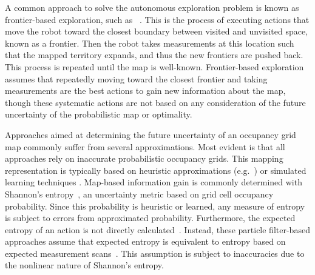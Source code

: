 \documentclass[letterpaper, 10pt]{ieeeconf}
\begin{document}
A common approach to solve the autonomous exploration problem is known as frontier-based exploration, such as ~\cite{Yam97,Yam98}. This is the process of executing actions that move the robot toward the closest boundary between visited and unvisited space, known as a frontier.
Then the robot takes measurements at this location such that the mapped territory expands, and thus the new frontiers are pushed back. This process is repeated until the map is well-known.
Frontier-based exploration assumes that repeatedly moving toward the closest frontier and taking measurements are the best actions to gain new information about the map, though these systematic actions are not based on any consideration of the future uncertainty of the probabilistic map or optimality.


Approaches aimed at determining the future uncertainty of an occupancy grid map commonly suffer from several approximations.
Most evident is that all approaches rely on inaccurate probabilistic occupancy grids. This mapping representation is typically based on heuristic approximations (e.g.~\cite{MorElf85,Elf89,ChoLynHutKanBurKavThr05,And09,PirRutBisSch11}) or simulated learning techniques \cite{ThrBurFox05,Thr01}. Map-based information gain is commonly determined with Shannon's entropy~\cite{CarDamKumCas15}, an uncertainty metric based on grid cell occupancy probability. Since this probability is heuristic or learned, any measure of entropy is subject to errors from approximated probability.
Furthermore, the expected entropy of an action is not directly calculated~\cite{CarDamKumCas15,StaGriBur05}. Instead, these particle filter-based approaches assume that expected entropy is equivalent to entropy based on expected measurement scans~\cite{JohStaPfaBur07}. This assumption is subject to inaccuracies due to the nonlinear nature of Shannon's entropy. %
\end{document}
